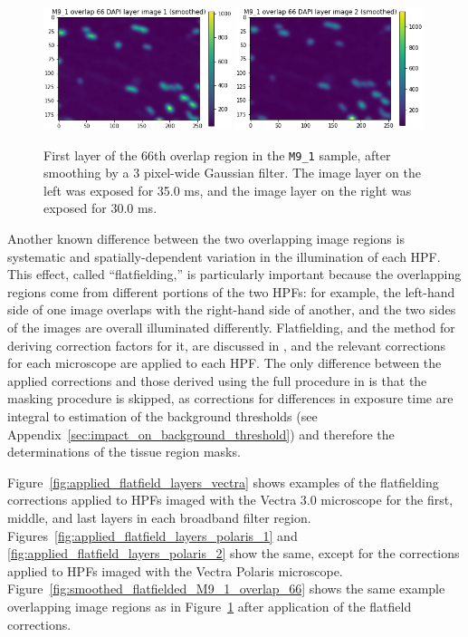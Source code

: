 \documentclass[letterpaper,11pt]{article}
\newcommand{\reffig}[1]{Figure~\ref{#1}}
\begin{document}
\begin{figure}[!ht]
\centering
\includegraphics[width=0.49\textwidth]{images/methods/smoothed_M9_1_overlap_66_dapi_image_1}
\includegraphics[width=0.49\textwidth]{images/methods/smoothed_M9_1_overlap_66_dapi_image_2}
\caption{\footnotesize First layer of the 66th overlap region in the \texttt{M9\_1} sample, after smoothing by a 3 pixel-wide Gaussian filter. The image layer on the left was exposed for 35.0 ms, and the image layer on the right was exposed for 30.0 ms.}
\label{fig:smoothed_M9_1_overlap_66}
\end{figure}

Another known difference between the two overlapping image regions is systematic and spatially-dependent variation in the illumination of each HPF. This effect, called ``flatfielding,'' is particularly important because the overlapping regions come from different portions of the two HPFs: for example, the left-hand side of one image overlaps with the right-hand side of another, and the two sides of the images are overall illuminated differently. Flatfielding, and the method for deriving correction factors for it, are discussed in \cite{flatfielding_note}, and the relevant corrections for each microscope are applied to each HPF. The only difference between the applied corrections and those derived using the full procedure in \cite{flatfielding_note} is that the masking procedure is skipped, as corrections for differences in exposure time are integral to estimation of the background thresholds (see Appendix~\ref{sec:impact_on_background_threshold}) and therefore the determinations of the tissue region masks. 

\reffig{fig:applied_flatfield_layers_vectra} shows examples of the flatfielding corrections applied to HPFs imaged with the Vectra 3.0 microscope for the first, middle, and last layers in each broadband filter region. Figures~\ref{fig:applied_flatfield_layers_polaris_1} and \ref{fig:applied_flatfield_layers_polaris_2} show the same, except for the corrections applied to HPFs imaged with the Vectra Polaris microscope. \reffig{fig:smoothed_flatfielded_M9_1_overlap_66} shows the same example overlapping image regions as in \reffig{fig:smoothed_M9_1_overlap_66} after application of the flatfield corrections.
\end{document}
